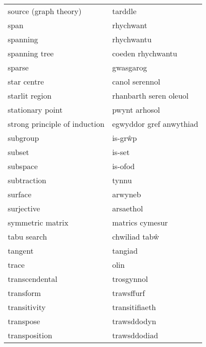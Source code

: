 \begin{supertabular}{p{0.22\textwidth}p{0.22\textwidth}}
            source (graph theory) &                          tarddle \\
                             span &                        rhychwant \\
                         spanning &                       rhychwantu \\
                    spanning tree &                coeden rhychwantu \\
                           sparse &                        gwasgarog \\
                      star centre &                   canol serennol \\
                   starlit region &           rhanbarth seren oleuol \\
                 stationary point &                    pwynt arhosol \\
    strong principle of induction &          egwyddor gref anwythiad \\
                         subgroup &                          is-grŵp \\
                           subset &                           is-set \\
                         subspace &                          is-ofod \\
                      subtraction &                            tynnu \\
                          surface &                          arwyneb \\
                       surjective &                        arsaethol \\
                 symmetric matrix &                  matrics cymesur \\
                      tabu search &                    chwiliad tabŵ \\
                          tangent &                          tangiad \\
                            trace &                             olin \\
                   transcendental &                       trosgynnol \\
                        transform &                       trawsffurf \\
                     transitivity &                   transitifiaeth \\
                        transpose &                      trawsddodyn \\
                    transposition &                     trawsddodiad \\

\end{supertabular}
